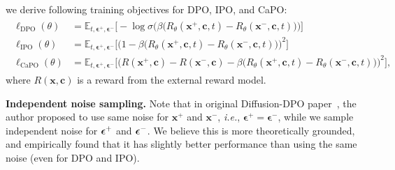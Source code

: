 we derive following training objectives for DPO, IPO, and CaPO:
\begin{align}
\begin{split}
    \ell_{\textrm{DPO}}(\theta) &= \mathbb{E}_{t,\boldsymbol{\epsilon}^+, \boldsymbol{\epsilon}^-}\bigg[ -\log \sigma \big(\beta \big(R_\theta(\mathbf{x}^+, \mathbf{c}, t) - R_\theta(\mathbf{x}^-, \mathbf{c}, t )\big)\big)\bigg]\\
    \ell_{\textrm{IPO}}(\theta) &= \mathbb{E}_{t,\boldsymbol{\epsilon}^+, \boldsymbol{\epsilon}^-}\bigg[ \bigg(1 -  \beta\big(R_\theta(\mathbf{x}^+, \mathbf{c}, t) - R_\theta(\mathbf{x}^-, \mathbf{c}, t )\big)\bigg)^2\bigg]\\
    \ell_{\textrm{CaPO}}(\theta) &= \mathbb{E}_{t,\boldsymbol{\epsilon}^+, \boldsymbol{\epsilon}^-}\bigg[ \bigg(R(\mathbf{x}^+, \mathbf{c}) - R(\mathbf{x}^-, \mathbf{c}) -  \beta\big(R_\theta(\mathbf{x}^+, \mathbf{c}, t) - R_\theta(\mathbf{x}^-, \mathbf{c}, t )\big)\bigg)^2\bigg]\text{,}
\end{split}
\end{align}
where $R(\mathbf{x}, \mathbf{c})$ is a reward from the external reward model.


\vspace{0.05in}
\noindent
{\bf Independent noise sampling.}
Note that in original Diffusion-DPO paper~\citep{wallace2023diffusion}, the author proposed to use same noise for $\mathbf{x}^+$ and $\mathbf{x}^-$, \emph{i.e.},  $\boldsymbol{\epsilon}^+ = \boldsymbol{\epsilon}^-$, while we sample independent noise for $\boldsymbol{\epsilon}^+$ and $\boldsymbol{\epsilon}^-$. We believe this is more theoretically grounded, and empirically found that it has slightly better performance than using the same noise (even for DPO and IPO).


